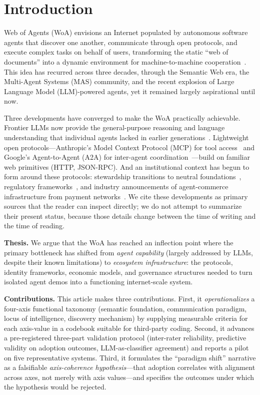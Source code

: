 \documentclass{IEEEcsmag}
\begin{document}
\section{Introduction}

 Web of Agents (WoA) envisions an Internet populated by autonomous software agents that discover one another, communicate through open protocols, and execute complex tasks on behalf of users, transforming the static ``web of documents'' into a dynamic environment for machine-to-machine cooperation~\cite{Berners-Lee_2001}. This idea has recurred across three decades, through the Semantic Web era, the Multi-Agent Systems (MAS) community, and the recent explosion of Large Language Model (LLM)-powered agents, yet it remained largely aspirational until now.

Three developments have converged to make the WoA practically achievable. Frontier LLMs now provide the general-purpose reasoning and language understanding that individual agents lacked in earlier generations~\cite{Brown_2020}.  Lightweight open protocols---Anthropic's Model Context Protocol (MCP) for tool access~\cite{MCP_2025} and Google's Agent-to-Agent (A2A) for inter-agent coordination~\cite{Google_2025_A2A}---build on familiar web primitives (HTTP, JSON-RPC).  And an institutional context has begun to form around these protocols: stewardship transitions to neutral foundations~\cite{AAIF_2025, A2A_LinuxFoundation_2025}, regulatory frameworks~\cite{EUAI_2024}, and industry announcements of agent-commerce infrastructure from payment networks~\cite{Visa_TAP_2025, Mastercard_AgentPay_2025, Stripe_OpenAI_ACP_2025}.  We cite these developments as primary sources that the reader can inspect directly; we do not attempt to summarize their present status, because those details change between the time of writing and the time of reading.

\textbf{Thesis.}  We argue that the WoA has reached an inflection point where the primary bottleneck has shifted from \emph{agent capability} (largely addressed by LLMs, despite their known limitations) to \emph{ecosystem infrastructure}: the protocols, identity frameworks, economic models, and governance structures needed to turn isolated agent demos into a functioning internet-scale system.

\textbf{Contributions.}  This article makes three contributions.  First, it \emph{operationalizes} a four-axis functional taxonomy (semantic foundation, communication paradigm, locus of intelligence, discovery mechanism) by supplying measurable criteria for each axis-value in a codebook suitable for third-party coding.  Second, it advances a pre-registered three-part validation protocol (inter-rater reliability, predictive validity on adoption outcomes, LLM-as-classifier agreement) and reports a pilot on five representative systems.  Third, it formulates the ``paradigm shift'' narrative as a falsifiable \emph{axis-coherence hypothesis}---that adoption correlates with alignment across axes, not merely with axis values---and specifies the outcomes under which the hypothesis would be rejected.
\end{document}
